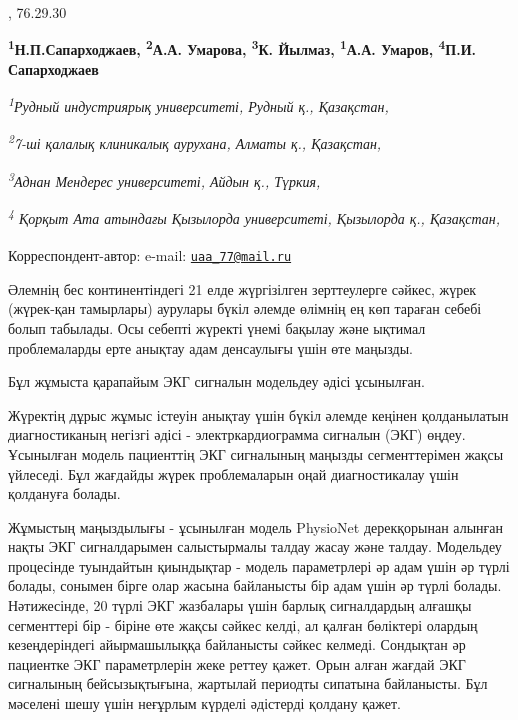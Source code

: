 , 76.29.30{}

\begin{articleheader}

{\bfseries
\textsuperscript{1}Н.П.Сапарходжаев\authorid,
\textsuperscript{2}А.А. Умарова\authorid,
\textsuperscript{3}К. Йылмаз\authorid,
\textsuperscript{1}А.А. Умаров\authorid,
\textsuperscript{4}П.И. Сапарходжаев\authorid}
\end{articleheader}

\begin{affiliation}
\emph{\textsuperscript{1}Рудный индустриярық университеті, Рудный қ., Қазақстан,}

\emph{\textsuperscript{2}7-ші қалалық клиникалық аурухана, Алматы қ., Қазақстан,}

\emph{\textsuperscript{3}Аднан Мендерес университеті, Айдын қ., Түркия,}

\emph{\textsuperscript{4} Қорқыт Ата атындағы Қызылорда университеті, Қызылорда қ., Қазақстан,}

\raggedright \textsuperscript{\envelope }Корреспондент-автор: e-mail: \href{mailto:uaa_77@mail.ru}{\nolinkurl{uaa\_77@mail.ru}}
\end{affiliation}

Әлемнің бес континентіндегі 21 елде жүргізілген зерттеулерге сәйкес,
жүрек (жүрек-қан тамырлары) аурулары бүкіл әлемде өлімнің ең көп тараған
себебі болып табылады. Осы себепті жүректі үнемі бақылау және ықтимал
проблемаларды ерте анықтау адам денсаулығы үшін өте маңызды.

Бұл жұмыста қарапайым ЭКГ сигналын модельдеу әдісі ұсынылған.

Жүректің дұрыс жұмыс істеуін анықтау үшін бүкіл әлемде кеңінен
қолданылатын диагностиканың негізгі әдісі - электркардиограмма сигналын
(ЭКГ) өңдеу. Ұсынылған модель пациенттің ЭКГ сигналының маңызды
сегменттерімен жақсы үйлеседі. Бұл жағдайды жүрек проблемаларын оңай
диагностикалау үшін қолдануға болады.

Жұмыстың маңыздылығы - ұсынылған модель PhysioNet дерекқорынан алынған
нақты ЭКГ сигналдарымен салыстырмалы талдау жасау және талдау. Модельдеу
процесінде туындайтын қиындықтар - модель параметрлері әр адам үшін әр
түрлі болады, сонымен бірге олар жасына байланысты бір адам үшін әр
түрлі болады. Нәтижесінде, 20 түрлі ЭКГ жазбалары үшін барлық
сигналдардың алғашқы сегменттері бір - біріне өте жақсы сәйкес келді, ал
қалған бөліктері олардың кезеңдеріндегі айырмашылыққа байланысты сәйкес
келмеді. Сондықтан әр пациентке ЭКГ параметрлерін жеке реттеу қажет.
Орын алған жағдай ЭКГ сигналының бейсызықтығына, жартылай периодты
сипатына байланысты. Бұл мәселені шешу үшін неғұрлым күрделі әдістерді
қолдану қажет.

